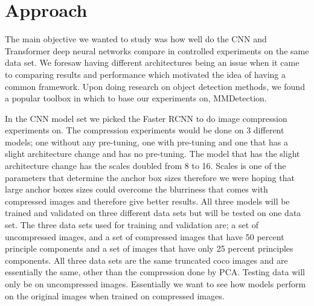\documentclass[10pt,twocolumn,letterpaper]{article}
\begin{document}

\section{Approach}


The main objective we wanted to study was how well do the CNN and Transformer deep neural networks compare in controlled experiments on the same data set. We foresaw having different architectures being an issue when it came to comparing results and performance which motivated the idea of having a common framework. Upon doing research on object detection methods, we found a popular toolbox in which to base our experiments on, MMDetection\cite{mmdetection}. 

In the CNN model set we picked the Faster RCNN to do image compression experiments on. The compression experiments would be done on 3 different models; one without any pre-tuning, one with pre-tuning and one that has a slight architecture change and has no pre-tuning. The model that has the slight architecture change has the scales doubled from 8 to 16. Scales is one of the parameters that determine the anchor box sizes therefore we were hoping that large anchor boxes sizes could overcome the blurriness that comes with compressed images and therefore give better results. All three models will be trained and validated on three different data sets but will be tested on one data set. The three data sets used for training and validation are; a set of  uncompressed images, and a set of compressed images that have 50 percent principle components and a set of images that have only 25 percent principles components. All three data sets are the same truncated coco images and are essentially the same, other than the compression done by PCA. Testing data will only be on uncompressed images. Essentially we want to see how models perform on the original images when trained on compressed images.
\end{document}
